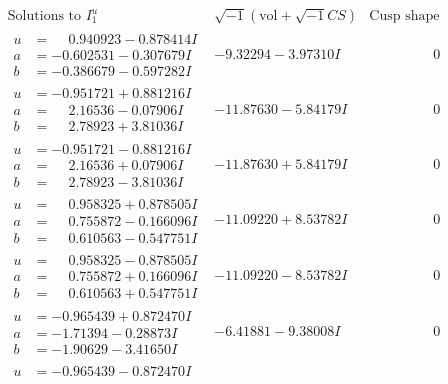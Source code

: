 \documentclass[1p]{elsarticle_modified}
\theoremstyle{definition}
\newcommand{\I}{\sqrt{-1}}
\begin{document}
$$\begin{array}{c|c|c}
\text{Solutions to }I^u_{1}& \I (\text{vol} + \sqrt{-1}CS) & \text{Cusp shape}\\
 \hline 
\begin{aligned}
u &= \phantom{-}0.940923 - 0.878414 I \\
a &= -0.602531 - 0.307679 I \\
b &= -0.386679 - 0.597282 I\end{aligned}
 & -9.32294 - 3.97310 I & \phantom{-0.000000 } 0 \\ \hline\begin{aligned}
u &= -0.951721 + 0.881216 I \\
a &= \phantom{-}2.16536 - 0.07906 I \\
b &= \phantom{-}2.78923 + 3.81036 I\end{aligned}
 & -11.87630 - 5.84179 I & \phantom{-0.000000 } 0 \\ \hline\begin{aligned}
u &= -0.951721 - 0.881216 I \\
a &= \phantom{-}2.16536 + 0.07906 I \\
b &= \phantom{-}2.78923 - 3.81036 I\end{aligned}
 & -11.87630 + 5.84179 I & \phantom{-0.000000 } 0 \\ \hline\begin{aligned}
u &= \phantom{-}0.958325 + 0.878505 I \\
a &= \phantom{-}0.755872 - 0.166096 I \\
b &= \phantom{-}0.610563 - 0.547751 I\end{aligned}
 & -11.09220 + 8.53782 I & \phantom{-0.000000 } 0 \\ \hline\begin{aligned}
u &= \phantom{-}0.958325 - 0.878505 I \\
a &= \phantom{-}0.755872 + 0.166096 I \\
b &= \phantom{-}0.610563 + 0.547751 I\end{aligned}
 & -11.09220 - 8.53782 I & \phantom{-0.000000 } 0 \\ \hline\begin{aligned}
u &= -0.965439 + 0.872470 I \\
a &= -1.71394 - 0.28873 I \\
b &= -1.90629 - 3.41650 I\end{aligned}
 & -6.41881 - 9.38008 I & \phantom{-0.000000 } 0 \\ \hline\begin{aligned}
u &= -0.965439 - 0.872470 I \\

\end{aligned}
\end{array}$$
\end{document}
